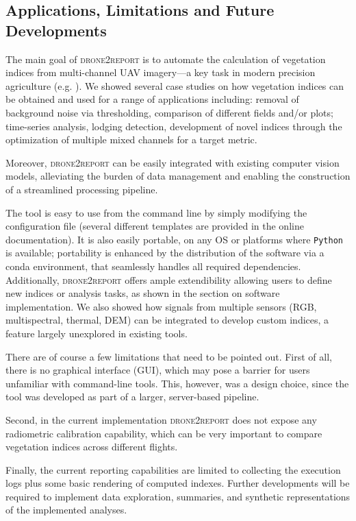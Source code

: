\documentclass[drones,technicalnote,accept,pdftex,moreauthors]{Definitions/mdpi}
\begin{document}
\subsection{Applications, Limitations and Future Developments}

The main goal of \textsc{drone2report} is to automate the calculation of vegetation indices from multi-channel UAV imagery—a key task in modern precision agriculture (e.g. \cite{candiago2015evaluating, radovcaj2023state, velez2023beyond}).
We showed several case studies on how vegetation indices can be obtained and used for a range of applications including: removal of background noise via thresholding, comparison of different fields and/or plots; time-series analysis, lodging detection, development of novel indices through the optimization of multiple mixed channels for a target metric. 

Moreover, \textsc{drone2report} can be easily integrated with existing computer vision models, alleviating the burden of data management and enabling the construction of a streamlined processing pipeline.

The tool is easy to use from the command line by simply modifying the configuration file (several different templates are provided in the online documentation). 
It is also easily portable, on any OS or platforms where \texttt{Python} is available; portability is enhanced by the distribution of the software via a conda environment, that seamlessly handles all required dependencies. 
Additionally, \textsc{drone2report} offers ample extendibility allowing users to define new indices or analysis tasks, as shown in the section on software implementation. We also showed how signals from multiple sensors (RGB, multispectral, thermal, DEM) can be integrated to develop custom indices, a feature largely unexplored in existing tools.

There are of course a few limitations that need to be pointed out. 
First of all, there is no graphical interface (GUI), which may pose a barrier for users unfamiliar with command-line tools. This, however, was a design choice, since the tool was developed as part of a larger, server-based pipeline.

Second, in the current implementation \textsc{drone2report} does not expose any radiometric calibration capability, which can be very important to compare vegetation indices across different flights.

Finally, the current reporting capabilities are limited to collecting the execution logs plus some basic rendering of computed indexes. Further developments will be required to implement data exploration, summaries, and synthetic representations of the implemented analyses.
\end{document}
